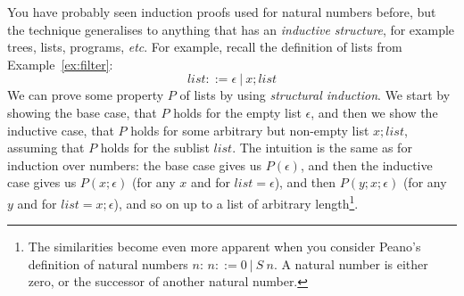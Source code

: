 \documentclass{tufte-handout}
\newcounter{example}
\newcommand{\RED}[1]{\textcolor{red}{#1}}
\begin{document}
You have probably seen induction proofs used for natural numbers
before, but the technique generalises to anything that has an
\emph{inductive structure}, for example trees, lists, programs,
\emph{etc}. %
For example, recall the definition of lists from
Example~\ref{ex:filter}:
\[
  \mathit{list} ::= \epsilon ~|~ x; \mathit{list}
\]
We can prove some property $P$ of lists by using \emph{structural
  induction}. We start by showing the base case, that $P$ holds
for the empty list $\epsilon$, and then we show the inductive
case, that $P$ holds for some arbitrary but non-empty list
$x;\mathit{list}$, assuming that $P$ holds for the sublist
$\mathit{list}$.
%
The intuition is the same as for induction over numbers: the base
case gives us $P(\epsilon)$, and then the inductive case gives us
$P(x;\epsilon)$ (for any $x$ and for $\mathit{list} = \epsilon$),
and then $P(y;x;\epsilon)$ (for any $y$ and for
$\mathit{list} = x;\epsilon$), and so on up to a list of arbitrary
length\footnote{The similarities become even more apparent when
  you consider Peano's definition of natural numbers $n$:
  $n ::= 0 ~|~ S~n$. A natural number is either zero, or the
  successor of another natural number. }.
\end{document}

